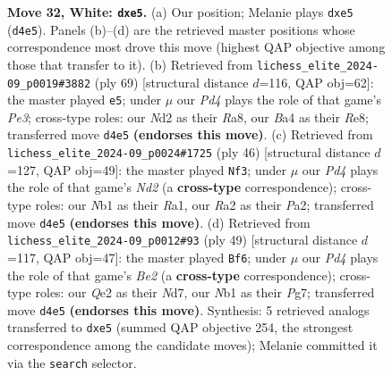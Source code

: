 \documentclass[11pt]{article}
\begin{document}
\begin{figure}[p]
\caption{\textbf{Move 32, White: \texttt{dxe5}.} (a) Our position; Melanie plays \texttt{dxe5} (\texttt{d4e5}). Panels (b)--(d) are the retrieved master positions whose correspondence most drove this move (highest QAP objective among those that transfer to it). (b) Retrieved from \texttt{lichess\_elite\_2024-09\_p0019\#3882} (ply 69) [structural distance $d$=116, QAP obj=62]: the master played \texttt{e5}; under $\mu$ our \emph{Pd4} plays the role of that game's \emph{Pe3}; cross-type roles: our \emph{N}d2 as their \emph{R}a8, our \emph{B}a4 as their \emph{R}e8; transferred move \texttt{d4e5} \textbf{(endorses this move)}. (c) Retrieved from \texttt{lichess\_elite\_2024-09\_p0024\#1725} (ply 46) [structural distance $d$=127, QAP obj=49]: the master played \texttt{Nf3}; under $\mu$ our \emph{Pd4} plays the role of that game's \emph{Nd2} (a \textbf{cross-type} correspondence); cross-type roles: our \emph{N}b1 as their \emph{R}a1, our \emph{R}a2 as their \emph{P}a2; transferred move \texttt{d4e5} \textbf{(endorses this move)}. (d) Retrieved from \texttt{lichess\_elite\_2024-09\_p0012\#93} (ply 49) [structural distance $d$=117, QAP obj=47]: the master played \texttt{Bf6}; under $\mu$ our \emph{Pd4} plays the role of that game's \emph{Be2} (a \textbf{cross-type} correspondence); cross-type roles: our \emph{Q}e2 as their \emph{N}d7, our \emph{N}b1 as their \emph{P}g7; transferred move \texttt{d4e5} \textbf{(endorses this move)}. Synthesis: 5 retrieved analogs transferred to \texttt{dxe5} (summed QAP objective 254, the strongest correspondence among the candidate moves); Melanie committed it via the \texttt{search} selector.}
\label{fig:thought-m62}
\end{figure}

\clearpage
\end{document}
